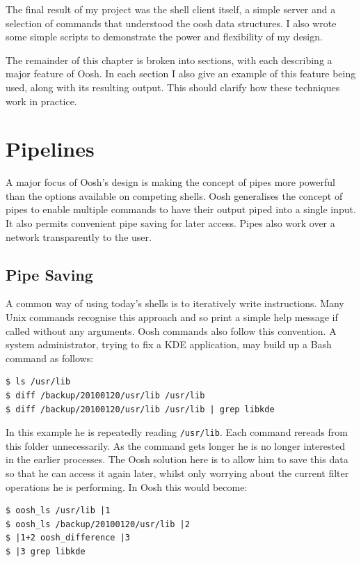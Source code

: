 \documentclass[12pt,twoside,notitlepage]{report}
\begin{document}
The final result of my project was the shell client itself, a simple server and
a selection of commands that understood the oosh data structures. I also wrote
some simple scripts to demonstrate the power and flexibility of my design.

The remainder of this chapter is broken into sections, with each
describing a major feature of Oosh. In each section I also give an example
of this feature being used, along with its resulting output. This
should clarify how these techniques work in practice.

\section{Pipelines}
A major focus of Oosh's design is making the concept of pipes more powerful than
the options available on competing shells. Oosh generalises the concept of pipes
to enable multiple commands to have their output piped into a single input. It
also permits convenient pipe saving for later access. Pipes also work over a
network transparently to the user.

\subsection{Pipe Saving}
A common way of using today's shells is to iteratively write
instructions. Many Unix commands recognise this approach and so print
a simple help message if called without any arguments. Oosh commands
also follow this convention. A system
administrator, trying to fix a KDE application, may build up a Bash
command as follows:

\begin{verbatim}
$ ls /usr/lib
$ diff /backup/20100120/usr/lib /usr/lib
$ diff /backup/20100120/usr/lib /usr/lib | grep libkde
\end{verbatim}

In this example he is repeatedly reading {\tt /usr/lib}. Each command
rereads from this folder unnecessarily. As the command gets longer he
is no longer interested in the earlier processes. The Oosh solution
here is to allow him to save this data so that he can access it again
later, whilst only worrying about the current filter operations he is
performing. In Oosh this would become:

\begin{verbatim}
$ oosh_ls /usr/lib |1
$ oosh_ls /backup/20100120/usr/lib |2
$ |1+2 oosh_difference |3
$ |3 grep libkde
\end{verbatim}
\end{document}
